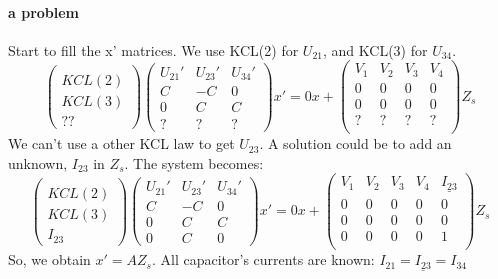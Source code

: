\documentclass[10pt]{article}
\begin{document}
\paragraph{a problem}
Start to fill the x' matrices. We use KCL(2) for $U_{21}$, and KCL(3) for $U_{34}$.
\[\left(\begin{array}{c}
  \\
KCL(2)\\KCL(3)\\??
\end{array}\right)
\left(\begin{array}{ccc}
  U_{21}'&U_{23}'&U_{34}'\\
  \hline
  C&-C&0\\
  0&C&C\\
  ?&?&?
\end{array}\right)x'=0x+
\left(\begin{array}{cccc}
  V_{1}&V_{2}&V_{3}&V_{4}\\
  \hline
  0&0&0&0\\
  0&0&0&0\\
  ?&?&?&?\\
\end{array}\right)Z_{s}
 \]
 We can't use a other KCL law to get $U_{23}$. A solution could be to add an unknown, \underline{$I_{23}$} in
 $Z_{s}$. The system becomes:\\
 \[\left(\begin{array}{c}
  \\
KCL(2)\\KCL(3)\\I_{23}
\end{array}\right)
\left(\begin{array}{ccc}
  U_{21}'&U_{23}'&U_{34}'\\
  \hline
  C&-C&0\\
  0&C&C\\
  0&C&0
\end{array}\right)x'=0x+
\left(\begin{array}{ccccc}
  V_{1}&V_{2}&V_{3}&V_{4}&\underline{I_{23}}\\
  \hline
  0&0&0&0&0\\
  0&0&0&0&0\\
  0&0&0&0&1\\
\end{array}\right)Z_{s}
 \]
 So, we obtain $x'=AZ_{s}$. All capacitor's currents are known:
 $I_{21}=\underline{I_{23}}=I_{34}$\\
\end{document}
